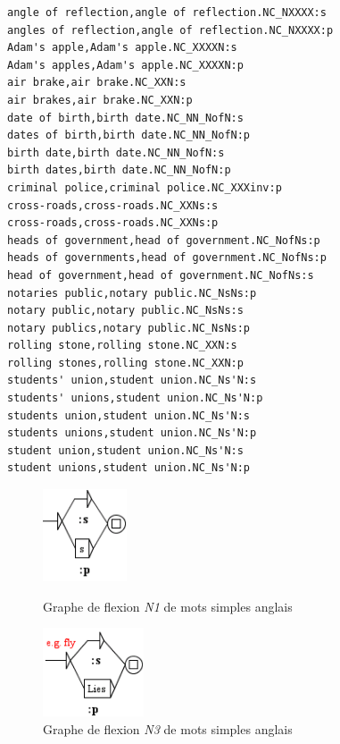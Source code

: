 \begin{verbatim}
angle of reflection,angle of reflection.NC_NXXXX:s
angles of reflection,angle of reflection.NC_NXXXX:p
Adam's apple,Adam's apple.NC_XXXXN:s
Adam's apples,Adam's apple.NC_XXXXN:p
air brake,air brake.NC_XXN:s
air brakes,air brake.NC_XXN:p
date of birth,birth date.NC_NN_NofN:s
dates of birth,birth date.NC_NN_NofN:p
birth date,birth date.NC_NN_NofN:s
birth dates,birth date.NC_NN_NofN:p
criminal police,criminal police.NC_XXXinv:p
cross-roads,cross-roads.NC_XXNs:s
cross-roads,cross-roads.NC_XXNs:p
heads of government,head of government.NC_NofNs:p
heads of governments,head of government.NC_NofNs:p
head of government,head of government.NC_NofNs:s
notaries public,notary public.NC_NsNs:p
notary public,notary public.NC_NsNs:s
notary publics,notary public.NC_NsNs:p
rolling stone,rolling stone.NC_XXN:s
rolling stones,rolling stone.NC_XXN:p
students' union,student union.NC_Ns'N:s
students' unions,student union.NC_Ns'N:p
students union,student union.NC_Ns'N:s
students unions,student union.NC_Ns'N:p
student union,student union.NC_Ns'N:s
student unions,student union.NC_Ns'N:p
\end{verbatim}
 
\begin{figure}[!ht]
\begin{minipage}[c]{0.45\textwidth}
 \centering
 \includegraphics[width=2.5cm]{resources/img/N1'EN.png}
 \caption{Graphe de flexion \emph{N1} de mots simples anglais}
  \label{fig:N1'EN}
\end{minipage}\hfill
\begin{minipage}[c]{0.5\textwidth}
 \centering
 \includegraphics[width=3cm]{resources/img/N3'EN.png}
  \caption{Graphe de flexion \emph{N3} de mots simples anglais}
  \label{fig:N3'EN}
\end{minipage}
\end{figure}


